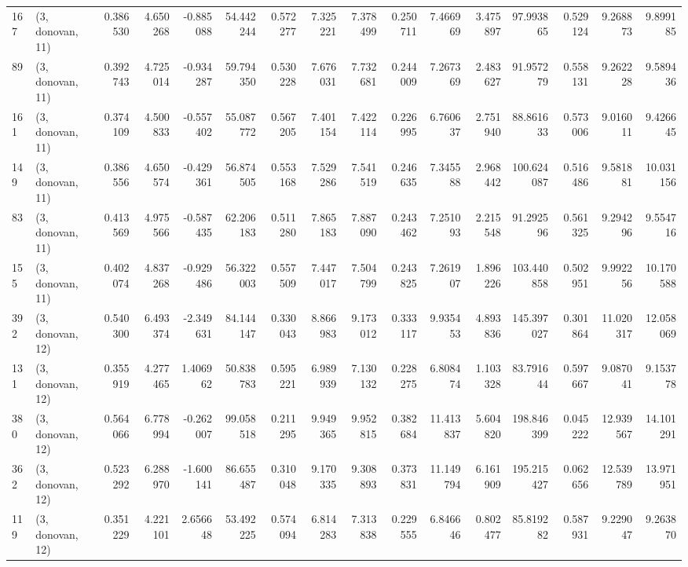 \begin{tabular}{llrrrrrrrrrrrrrr}
167 &  (3, donovan, 11) &   0.386530 &   4.650268 &  -0.885088 &    54.442244 &   0.572277 &   7.325221 &   7.378499 &  0.250711 &   7.466969 &   3.475897 &    97.993865 &  0.529124 &   9.268873 &   9.899185 \\
89  &  (3, donovan, 11) &   0.392743 &   4.725014 &  -0.934287 &    59.794350 &   0.530228 &   7.676031 &   7.732681 &  0.244009 &   7.267369 &   2.483627 &    91.957279 &  0.558131 &   9.262228 &   9.589436 \\
161 &  (3, donovan, 11) &   0.374109 &   4.500833 &  -0.557402 &    55.087772 &   0.567205 &   7.401154 &   7.422114 &  0.226995 &   6.760637 &   2.751940 &    88.861633 &  0.573006 &   9.016011 &   9.426645 \\
149 &  (3, donovan, 11) &   0.386556 &   4.650574 &  -0.429361 &    56.874505 &   0.553168 &   7.529286 &   7.541519 &  0.246635 &   7.345588 &   2.968442 &   100.624087 &  0.516486 &   9.581881 &  10.031156 \\
83  &  (3, donovan, 11) &   0.413569 &   4.975566 &  -0.587435 &    62.206183 &   0.511280 &   7.865183 &   7.887090 &  0.243462 &   7.251093 &   2.215548 &    91.292596 &  0.561325 &   9.294296 &   9.554716 \\
155 &  (3, donovan, 11) &   0.402074 &   4.837268 &  -0.929486 &    56.322003 &   0.557509 &   7.447017 &   7.504799 &  0.243825 &   7.261907 &   1.896226 &   103.440858 &  0.502951 &   9.992256 &  10.170588 \\
392 &  (3, donovan, 12) &   0.540300 &   6.493374 &  -2.349631 &    84.144147 &   0.330043 &   8.866983 &   9.173012 &  0.333117 &   9.935453 &   4.893836 &   145.397027 &  0.301864 &  11.020317 &  12.058069 \\
131 &  (3, donovan, 12) &   0.355919 &   4.277465 &   1.406962 &    50.838783 &   0.595221 &   6.989939 &   7.130132 &  0.228275 &   6.808474 &   1.103328 &    83.791644 &  0.597667 &   9.087041 &   9.153778 \\
380 &  (3, donovan, 12) &   0.564066 &   6.778994 &  -0.262007 &    99.058518 &   0.211295 &   9.949365 &   9.952815 &  0.382684 &  11.413837 &   5.604820 &   198.846399 &  0.045222 &  12.939567 &  14.101291 \\
362 &  (3, donovan, 12) &   0.523292 &   6.288970 &  -1.600141 &    86.655487 &   0.310048 &   9.170335 &   9.308893 &  0.373831 &  11.149794 &   6.161909 &   195.215427 &  0.062656 &  12.539789 &  13.971951 \\
119 &  (3, donovan, 12) &   0.351229 &   4.221101 &   2.656648 &    53.492225 &   0.574094 &   6.814283 &   7.313838 &  0.229555 &   6.846646 &   0.802477 &    85.819282 &  0.587931 &   9.229047 &   9.263870 \\

\end{tabular}
